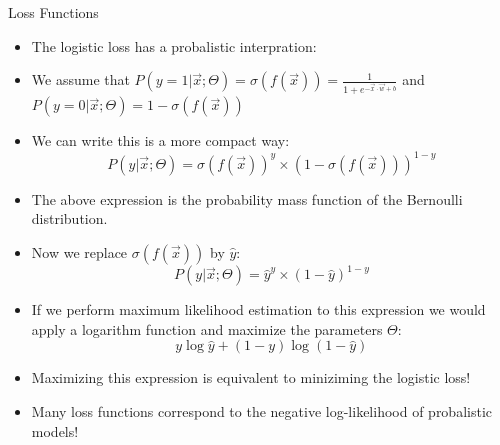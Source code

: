 \documentclass[handout]{beamer}
\begin{document}
\begin{frame}{Loss Functions}
\begin{scriptsize}
\begin{itemize}


 \item The logistic loss has a probalistic interpration:
 \item We assume that $P(y =1 | \vec{x} ; \Theta) = \sigma(f(\vec{x})) = \frac{1}{1+e^{-\vec{x}\cdot \vec{w}+b}}$  and $P(y = 0 | \vec{x} ; \Theta) = 1 - \sigma(f(\vec{x}))$
 \item We can write this is a more compact way: 
 \begin{displaymath}
  P(y | \vec{x} ; \Theta) = \sigma(f(\vec{x}))^y\times(1-\sigma(f(\vec{x})))^{1-y}
 \end{displaymath}

 \item The above expression is the probability mass function of the Bernoulli distribution.
 
\item Now we replace $\sigma(f(\vec{x}))$ by $\hat{y}$:
 \begin{displaymath}
  P(y | \vec{x} ; \Theta) = \hat{y}^y\times(1-\hat{y})^{1-y}
 \end{displaymath} 
\item If we perform maximum likelihood estimation to this expression we would apply a logarithm function and maximize the parameters $\Theta$:
 \begin{displaymath}
  y \log \hat{y} + (1-y) \log(1-\hat{y}) 
 \end{displaymath} 
 
\item Maximizing this expression is equivalent to miniziming the logistic loss!
 
\item Many loss functions correspond to the negative log-likelihood of probalistic models!
 
\end{itemize}
\end{scriptsize}

\end{frame}
\end{document}
